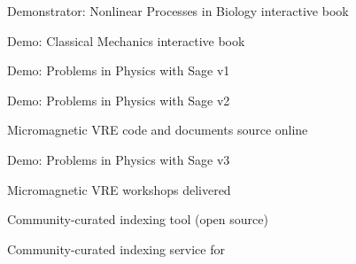 \begin{workpackage}
\begin{wpdelivs}
 \begin{wpdeliv}[due=36,id=ibook2,dissem=PU,nature=DEM]{Demonstrator: Nonlinear Processes in Biology  interactive book} \end{wpdeliv}

 \begin{wpdeliv}[due=40,id=ibook2,dissem=PU,nature=DEM]{Demo: Classical Mechanics interactive book} \end{wpdeliv}

 \begin{wpdeliv}[due=12,id=ibook3a,dissem=PU,nature=DEM]{Demo: Problems in Physics with Sage v1} \end{wpdeliv}
 \begin{wpdeliv}[due=30,id=ibook3b,dissem=PU,nature=DEM]{Demo: Problems in Physics with Sage v2} \end{wpdeliv}
 \begin{wpdeliv}[due=32,id=oommfnb-source-and-testing-setup,dissem=PU,nature=DEC,lead=USO]{Micromagnetic
     VRE code and documents source online} \end{wpdeliv}
 \begin{wpdeliv}[due=44,id=ibook3c,dissem=PU,nature=DEM]{Demo: Problems in Physics with Sage v3} \end{wpdeliv}
 \begin{wpdeliv}[due=44,id=oommfnb-workshops,dissem=PU,nature=OTHER,lead=USO]{Micromagnetic
     VRE workshops delivered} \end{wpdeliv}
 \begin{wpdeliv}[due=24,id=ils-tool,dissem=PU,nature=P]{Community-curated
     indexing tool (open source)} \end{wpdeliv}
 \begin{wpdeliv}[due=24,id=ils-service,dissem=PU,nature=DEM]{Community-curated
     indexing service for \TheProject} \end{wpdeliv}
\end{wpdelivs}


\end{workpackage}


